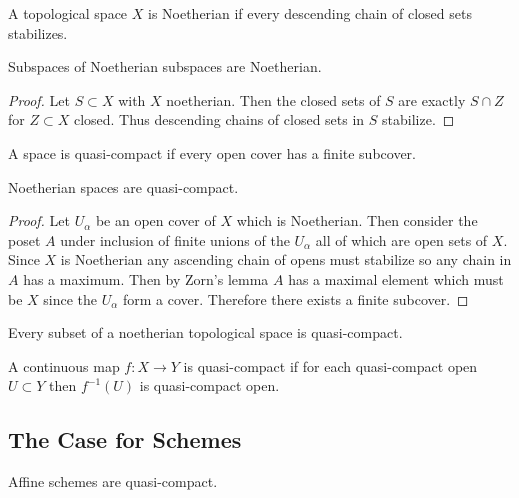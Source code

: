 \documentclass[12pt]{article}
\begin{document}
\begin{defn}
A topological space $X$ is Noetherian if every descending chain of closed sets stabilizes.
\end{defn}

\begin{lemma}
Subspaces of Noetherian subspaces are Noetherian.
\end{lemma}

\begin{proof}
Let $S \subset X$ with $X$ noetherian. Then the closed sets of $S$ are exactly $S \cap Z$ for $Z \subset X$ closed. Thus descending chains of closed sets in $S$ stabilize.
\end{proof}

\begin{defn}
A space is quasi-compact if every open cover has a finite subcover.
\end{defn}

\begin{lemma}
Noetherian spaces are quasi-compact. 
\end{lemma}

\begin{proof}
Let $U_{\alpha}$ be an open cover of $X$ which is Noetherian. Then consider the poset $A$ under inclusion of finite unions of the $U_\alpha$ all of which are open sets of $X$. Since $X$ is Noetherian any ascending chain of opens must stabilize so any chain in $A$ has a maximum. Then by Zorn's lemma $A$ has a maximal element which must be $X$ since the $U_\alpha$ form a cover. Therefore there exists a finite subcover.
\end{proof}

\begin{cor}
Every subset of a noetherian topological space is quasi-compact.
\end{cor}

\begin{defn}
A continuous map $f : X \to Y$ is quasi-compact if for each quasi-compact open $U \subset Y$ then $f^{-1}(U)$ is quasi-compact open.
\end{defn}

\subsection{The Case for Schemes}


\begin{lemma}
Affine schemes are quasi-compact.
\end{lemma}
\end{document}
